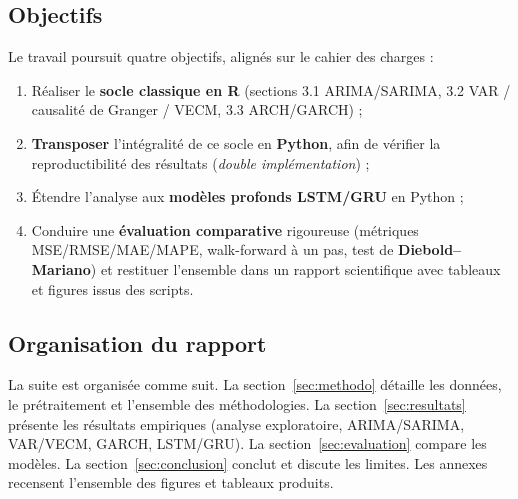 \subsection{Objectifs}
Le travail poursuit quatre objectifs, alignés sur le cahier des charges :
\begin{enumerate}
  \item Réaliser le \textbf{socle classique en R} (sections 3.1 ARIMA/SARIMA,
        3.2 VAR / causalité de Granger / VECM, 3.3 ARCH/GARCH) ;
  \item \textbf{Transposer} l'intégralité de ce socle en \textbf{Python}, afin
        de vérifier la reproductibilité des résultats (\emph{double
        implémentation}) ;
  \item Étendre l'analyse aux \textbf{modèles profonds LSTM/GRU} en Python ;
  \item Conduire une \textbf{évaluation comparative} rigoureuse (métriques
        MSE/RMSE/MAE/MAPE, walk-forward à un pas, test de
        \textbf{Diebold--Mariano}) et restituer l'ensemble dans un rapport
        scientifique avec tableaux et figures issus des scripts.
\end{enumerate}

\subsection{Organisation du rapport}
La suite est organisée comme suit. La section~\ref{sec:methodo} détaille les
données, le prétraitement et l'ensemble des méthodologies. La
section~\ref{sec:resultats} présente les résultats empiriques (analyse
exploratoire, ARIMA/SARIMA, VAR/VECM, GARCH, LSTM/GRU). La
section~\ref{sec:evaluation} compare les modèles. La
section~\ref{sec:conclusion} conclut et discute les limites. Les annexes
recensent l'ensemble des figures et tableaux produits.

